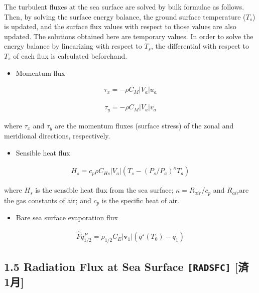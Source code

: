 The turbulent fluxes at the sea surface are solved by bulk formulae as
follows. Then, by solving the surface energy balance, the ground surface
temperature (\(T_s\)) is updated, and the surface flux values with
respect to those values are also updated. The solutions obtained here
are temporary values. In order to solve the energy balance by
linearizing with respect to \(T_s\), the differential with respect to
\(T_s\) of each flux is calculated beforehand.

\begin{itemize}
\tightlist
\item
  Momentum flux
\end{itemize}

\begin{eqnarray}
 \tau_x = - \rho C_{M}|V_a| u_a
\end{eqnarray}

\begin{eqnarray}
 \tau_y = - \rho C_{M}|V_a| v_a
\end{eqnarray}

where \(\tau_x\) and \(\tau_y\) are the momentum fluxes (surface stress)
of the zonal and meridional directions, respectively.

\begin{itemize}
\tightlist
\item
  Sensible heat flux
\end{itemize}

\begin{eqnarray}
 H_s = c_p \rho C_{Hs}|V_a| (T_s - (P_s/P_a)^{\kappa}T_a)
\end{eqnarray}

where \(H_s\) is the sensible heat flux from the sea surface;
\(\kappa = R_{air} / c_p\) and \(R_{air}\)are the gas constants of air;
and \(c_p\) is the specific heat of air.

\begin{itemize}
\tightlist
\item
  Bare sea surface evaporation flux
\end{itemize}

\begin{eqnarray}
\hat{F}q^P_{1/2} = \rho_{1/2} C_E |{\mathbf{v}}_1| \left( q^\star(T_0) - q_1 \right)
\end{eqnarray}

\hypertarget{radiation-flux-at-sea-surface-radsfc-ux6e08-1ux6708}{%
\subsection{\texorpdfstring{1.5 Radiation Flux at Sea Surface
\texttt{{[}RADSFC{]}} {[}済
1月{]}}{1.5 Radiation Flux at Sea Surface {[}RADSFC{]} {[}済 1月{]}}}\label{radiation-flux-at-sea-surface-radsfc-ux6e08-1ux6708}}

